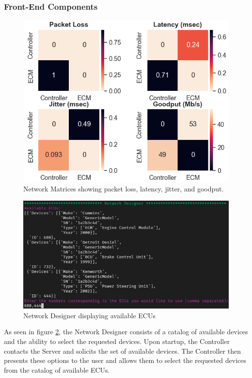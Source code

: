 \documentclass[letterpaper,twocolumn,12pt]{article}
\begin{document}
\subsubsection{Front-End Components}
\begin{figure}[]
    \centering
    \includegraphics[width=\linewidth]{images/network_matrix.png}
    \caption[]{Network Matrices showing packet loss, latency, jitter, and goodput.}
    \label{fig:network_matrix}
\end{figure}
\begin{figure}[]
    \centering
    \includegraphics[width=\linewidth]{images/network_designer.png}
    \caption[]{Network Designer displaying available ECUs\protect\footnotemark}
    \label{fig:network_designer}
\end{figure}

As seen in figure \ref{fig:network_designer}, the Network Designer consists of a catalog of available devices and the ability to select the requested devices. Upon startup, the Controller contacts the Server and solicits the set of available devices. The Controller then presents these options to the user and allows them to select the requested devices from the catalog of available ECUs.
\end{document}
